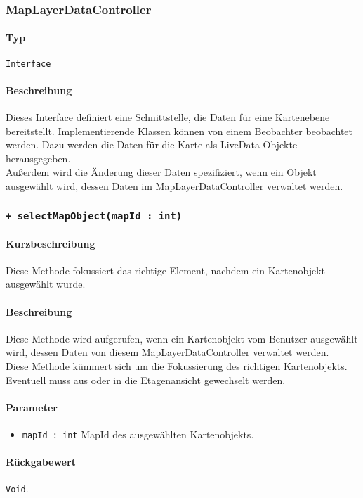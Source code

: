 \subsubsection{MapLayerDataController}
\paragraph*{Typ} 
\texttt{Interface}
\paragraph*{Beschreibung}
Dieses Interface definiert eine Schnittstelle, die Daten für eine Kartenebene bereitstellt.
Implementierende Klassen können von einem Beobachter beobachtet werden. Dazu werden die 
Daten für die Karte als LiveData-Objekte herausgegeben.\\
Außerdem wird die Änderung dieser Daten spezifiziert, wenn ein Objekt ausgewählt wird, dessen
Daten im MapLayerDataController verwaltet werden.

\subsubsection*{\texttt{+ selectMapObject(mapId : int)}}%
\paragraph*{Kurzbeschreibung}
Diese Methode fokussiert das richtige Element, nachdem ein Kartenobjekt ausgewählt wurde.
\paragraph*{Beschreibung}
Diese Methode wird aufgerufen, wenn ein Kartenobjekt vom Benutzer ausgewählt wird, dessen 
Daten von diesem MapLayerDataController verwaltet werden.\\
Diese Methode kümmert sich um die Fokussierung des richtigen Kartenobjekts. Eventuell muss 
aus oder in die Etagenansicht gewechselt werden.
\paragraph*{Parameter}
\begin{itemize}
    \item \texttt{mapId : int} MapId des ausgewählten Kartenobjekts.
\end{itemize}
\paragraph*{Rückgabewert}
\texttt{Void}.

